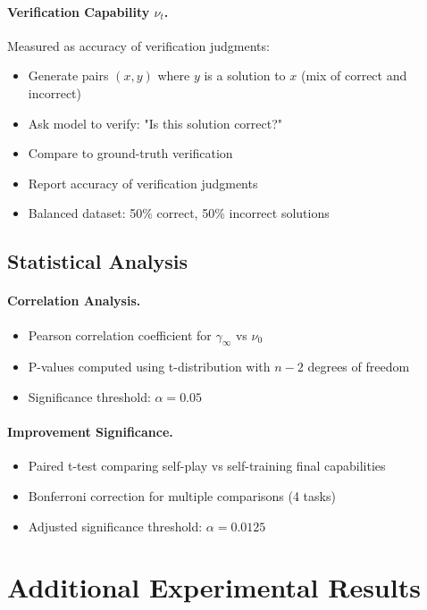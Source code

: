 \documentclass{article}
\theoremstyle{definition}
\theoremstyle{remark}
\begin{document}
\paragraph{Verification Capability \(\nu_t\).}
Measured as accuracy of verification judgments:
\begin{itemize}
\item Generate pairs \((x, y)\) where \(y\) is a solution to \(x\) (mix of correct and incorrect)
\item Ask model to verify: "Is this solution correct?"
\item Compare to ground-truth verification
\item Report accuracy of verification judgments
\item Balanced dataset: 50\% correct, 50\% incorrect solutions
\end{itemize}

\subsection{Statistical Analysis}

\paragraph{Correlation Analysis.}
\begin{itemize}
\item Pearson correlation coefficient for \(\gamma_\infty\) vs \(\nu_0\)
\item P-values computed using t-distribution with \(n-2\) degrees of freedom
\item Significance threshold: \(\alpha = 0.05\)
\end{itemize}

\paragraph{Improvement Significance.}
\begin{itemize}
\item Paired t-test comparing self-play vs self-training final capabilities
\item Bonferroni correction for multiple comparisons (4 tasks)
\item Adjusted significance threshold: \(\alpha = 0.0125\)
\end{itemize}

\section{Additional Experimental Results}
\label{sec:additional-results}
\end{document}
